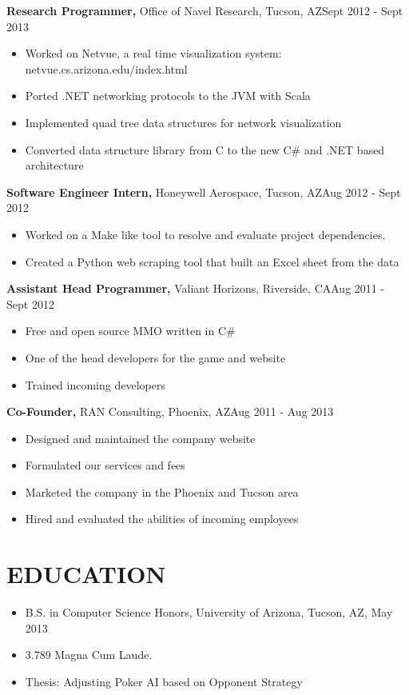 \documentclass{res}
\begin{document}
\begin{resume}
  {\bf Research Programmer,} Office of Navel Research, Tucson, AZ\hfill Sept 2012 - Sept 2013
  \begin{itemize} \itemsep -2pt %
    \item Worked on Netvue, a real time visualization system: netvue.cs.arizona.edu/index.html
    \item Ported .NET networking protocols to the JVM with Scala
    \item Implemented quad tree data structures for network visualization
    \item Converted data structure library from C to the new C\# and .NET based architecture
  \end{itemize}

  {\bf Software Engineer Intern,} Honeywell Aerospace, Tucson, AZ\hfill Aug 2012 - Sept 2012
  \begin{itemize} \itemsep -2pt %
    \item Worked on a Make like tool to resolve and evaluate project dependencies.
    \item Created a Python web scraping tool that built an Excel sheet from the data
  \end{itemize}

  {\bf Assistant Head Programmer,} Valiant Horizons, Riverside, CA\hfill Aug 2011 - Sept 2012
  \begin{itemize} \itemsep -2pt %
    \item Free and open source MMO written in C\#
    \item One of the head developers for the game and website
    \item Trained incoming developers
  \end{itemize}

  {\bf Co-Founder,} RAN Consulting, Phoenix, AZ\hfill Aug 2011 - Aug 2013
  \begin{itemize} \itemsep -2pt %
    \item Designed and maintained the company website
    \item Formulated our services and fees
    \item Marketed the company in the Phoenix and Tucson area
    \item Hired and evaluated the abilities of incoming employees
  \end{itemize}

\section{EDUCATION} 
  \begin{itemize} \itemsep -2pt %
    \item B.S. in Computer Science Honors, University of Arizona, Tucson, AZ, May 2013
    \item 3.789 Magna Cum Laude. 
    \item Thesis: Adjusting Poker AI based on Opponent Strategy
  \end{itemize}


\end{resume}
\end{document}
